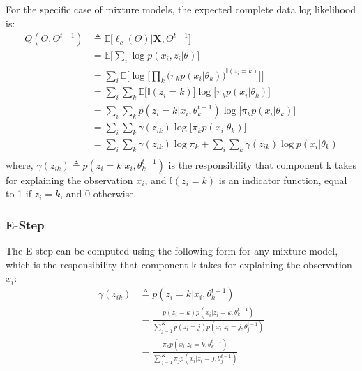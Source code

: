 For the specific case of mixture models, the expected complete data log likelihood is:
\begin{equation} \label{log-lik-expected-derivation-f-mm}
	\begin{aligned}
		Q(\Theta, \Theta^{t-1}) & \triangleq \mathbb{E} \big[\ell_{c}(\Theta) | \mathbf{X}, \Theta^{t-1}\big] \\
								& = \mathbb{E} \bigg[ \sum_{i} \log p(x_{i}, z_{i}|\theta) \bigg] \\
								& = \sum_{i} \mathbb{E} \bigg[ \log \bigg[\prod_{k} \big( \pi_{k}p(x_{i}|\theta_{k})\big)^{\mathbb{I}(z_{i}=k)} \bigg]\bigg] \\
								& = \sum_{i} \sum_{k} \mathbb{E} \big[\mathbb{I}(z_{i}=k)\big] \log \big[\pi_{k}p(x_{i}|\theta_{k})\big] \\
								& = \sum_{i} \sum_{k} p(z_{i}=k|x_{i},\theta_{k}^{t-1}) \log \big[\pi_{k}p(x_{i}|\theta_{k})\big] \\
								& = \sum_{i} \sum_{k} \gamma(z_{ik}) \log \big[\pi_{k}p(x_{i}|\theta_{k})\big] \\
								& = \sum_{i} \sum_{k} \gamma(z_{ik}) \log \pi_{k} + \sum_{i} \sum_{k} \gamma(z_{ik}) \log p(x_{i}|\theta_{k}) \\		
	\end{aligned}
\end{equation}
where, $\gamma(z_{ik}) \triangleq p(z_{i}=k|x_{i},\theta_{k}^{t-1})$ is the responsibility that component k takes for explaining the observation $x_{i}$, and $\mathbb{I}(z_{i}=k)$ is an indicator function, equal to 1 if $z_{i}=k$, and 0 otherwise.


\subsubsection{E-Step}
The E-step can be computed using the following form for any mixture model, which is the responsibility that component k takes for explaining the observation $x_{i}$:
\begin{equation} \label{responsibilities-f-mm}
  \begin{aligned}
	\gamma(z_{ik}) & \triangleq p(z_{i}=k|x_{i},\theta_{k}^{t-1}) \\
				   & = \frac{p(z_{i}=k)p(x_{i}|z_{i}=k,\theta_{k}^{t-1})}{\sum\limits_{j=1}^{K} p(z_{i}=j)p(x_{i}|z_{i}=j,\theta_{j}^{t-1})} \\
				   & = \frac{\pi_{k}p(x_{i}|z_{i}=k,\theta_{k}^{t-1})}{\sum\limits_{j=1}^{K} \pi_{j}p(x_{i}|z_{i}=j,\theta_{j}^{t-1})}
  \end{aligned}
\end{equation}


